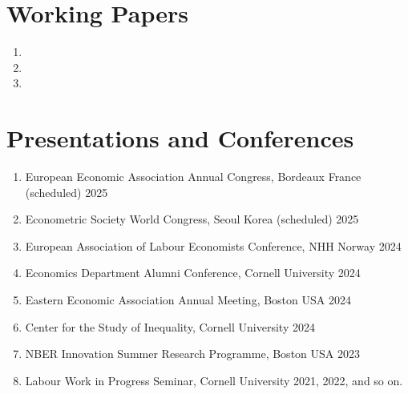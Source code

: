 \documentclass[letterpaper,11pt,oneside]{article}
\begin{document}

\section*{Working Papers}
\begin{enumerate}[itemsep=2.5pt, label={}]
    \item {}
    \item {}
    \item {}
\end{enumerate}



\section*{Presentations and Conferences}
\begin{enumerate}[itemsep=2pt, label={}]
    \item European Economic Association Annual Congress, Bordeaux France \hfill (scheduled) 2025
    \item Econometric Society World Congress, Seoul Korea \hfill (scheduled) 2025
    \item European Association of Labour Economists Conference, NHH Norway \hfill 2024
    \item Economics Department Alumni Conference, Cornell University \hfill 2024
    \item Eastern Economic Association Annual Meeting, Boston USA \hfill 2024
    \item Center for the Study of Inequality, Cornell University \hfill 2024
    \item NBER Innovation Summer Research Programme, Boston USA \hfill 2023
    \item Labour Work in Progress Seminar, Cornell University \hfill 2021, 2022, and so on.
\end{enumerate}
\end{document}

